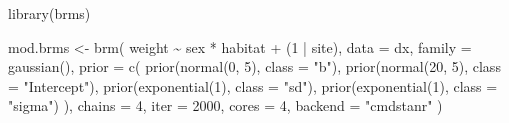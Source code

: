 \documentclass[
  13,
  letterpaper,
]{report}
\newenvironment{Shaded}{\begin{snugshade}}{\end{snugshade}}
\newcommand{\AttributeTok}[1]{\textcolor[rgb]{0.40,0.45,0.13}{#1}}
\newcommand{\DecValTok}[1]{\textcolor[rgb]{0.68,0.00,0.00}{#1}}
\newcommand{\FunctionTok}[1]{\textcolor[rgb]{0.28,0.35,0.67}{#1}}
\newcommand{\NormalTok}[1]{\textcolor[rgb]{0.00,0.23,0.31}{#1}}
\newcommand{\OtherTok}[1]{\textcolor[rgb]{0.00,0.23,0.31}{#1}}
\newcommand{\SpecialCharTok}[1]{\textcolor[rgb]{0.37,0.37,0.37}{#1}}
\newcommand{\StringTok}[1]{\textcolor[rgb]{0.13,0.47,0.30}{#1}}
\begin{document}
\begin{Shaded}
\begin{Highlighting}[]
\FunctionTok{library}\NormalTok{(brms)}


\NormalTok{mod.brms }\OtherTok{\textless{}{-}} \FunctionTok{brm}\NormalTok{(}
\NormalTok{    weight }\SpecialCharTok{\textasciitilde{}}\NormalTok{ sex }\SpecialCharTok{*}\NormalTok{ habitat }\SpecialCharTok{+}\NormalTok{ (}\DecValTok{1} \SpecialCharTok{|}\NormalTok{ site),}
    \AttributeTok{data =}\NormalTok{ dx,}
    \AttributeTok{family =} \FunctionTok{gaussian}\NormalTok{(),}
    \AttributeTok{prior =} \FunctionTok{c}\NormalTok{(}
        \FunctionTok{prior}\NormalTok{(}\FunctionTok{normal}\NormalTok{(}\DecValTok{0}\NormalTok{, }\DecValTok{5}\NormalTok{), }\AttributeTok{class =} \StringTok{"b"}\NormalTok{),}
        \FunctionTok{prior}\NormalTok{(}\FunctionTok{normal}\NormalTok{(}\DecValTok{20}\NormalTok{, }\DecValTok{5}\NormalTok{), }\AttributeTok{class =} \StringTok{"Intercept"}\NormalTok{),}
        \FunctionTok{prior}\NormalTok{(}\FunctionTok{exponential}\NormalTok{(}\DecValTok{1}\NormalTok{), }\AttributeTok{class =} \StringTok{"sd"}\NormalTok{),}
        \FunctionTok{prior}\NormalTok{(}\FunctionTok{exponential}\NormalTok{(}\DecValTok{1}\NormalTok{), }\AttributeTok{class =} \StringTok{"sigma"}\NormalTok{)}
\NormalTok{    ),}
    \AttributeTok{chains =} \DecValTok{4}\NormalTok{,}
    \AttributeTok{iter =} \DecValTok{2000}\NormalTok{,}
    \AttributeTok{cores =} \DecValTok{4}\NormalTok{,}
    \AttributeTok{backend =} \StringTok{"cmdstanr"}
\NormalTok{)}
\end{Highlighting}
\end{Shaded}
\end{document}

